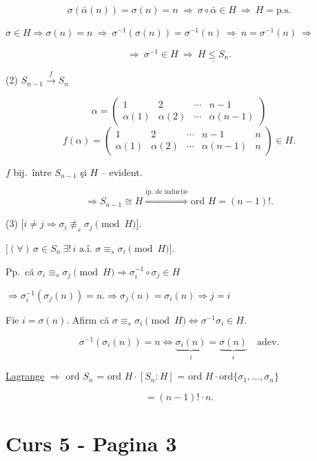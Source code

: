 \[
\sigma(\bar\alpha(n))=\sigma(n)=n \ \Rightarrow \ \sigma\circ\bar\alpha\in H \ \Rightarrow \ H = \text{p.s.}
\]

\noindent $\sigma\in H \Rightarrow \sigma(n)=n \ \Rightarrow \ \sigma^{-1}(\sigma(n))=\sigma^{-1}(n) \ \Rightarrow \ n=\sigma^{-1}(n) \ \Rightarrow$

\[
\Rightarrow \ \sigma^{-1}\in H \ \Rightarrow \ \underline{H\leq S_n}.
\]

\bigskip
\noindent (2) \quad $S_{n-1} \xrightarrow{\ f\ } S_n$

\[
\alpha = \begin{pmatrix} 1 & 2 & \cdots & n-1 \\ \alpha(1) & \alpha(2) & \cdots & \alpha(n-1) \end{pmatrix}
\]
\[
f(\alpha) = \begin{pmatrix} 1 & 2 & \cdots & n-1 & n \\ \alpha(1) & \alpha(2) & \cdots & \alpha(n-1) & n \end{pmatrix} \in H.
\]

\noindent $f$ bij.\ între $S_{n-1}$ şi $H$ -- evident.

\[
\Rightarrow S_{n-1}\cong H \overset{\text{ip.\ de inducție}}{\Longrightarrow} \text{ord } H=(n-1)!.
\]

\bigskip
\noindent (3) \quad $\big[i\neq j \Rightarrow \sigma_i \not\equiv_s \sigma_j \pmod H\big]$.

\noindent $\big[(\forall)\, \sigma\in S_n \ \exists!\, i \text{ a.î. } \sigma\equiv_s \sigma_i \pmod H\big]$.

\bigskip
\noindent Pp.\ că $\sigma_i\equiv_s\sigma_j \pmod H \Rightarrow \sigma_i^{-1}\circ\sigma_j\in H$

\noindent $\Rightarrow \sigma_i^{-1}(\sigma_j(n))=n. \Rightarrow \sigma_j(n)=\sigma_i(n) \Rightarrow j=i$

\bigskip
\noindent Fie $i=\sigma(n)$. Afirm că $\sigma\equiv_s\sigma_i \pmod H \Leftrightarrow \sigma^{-1}\sigma_i\in H$.

\[
\sigma^{-1}(\sigma_i(n))=n \Leftrightarrow \underbrace{\sigma_i(n)}_{i} = \underbrace{\sigma(n)}_{i} \quad \text{adev.}
\]

\bigskip
\noindent\underline{Lagrange} $\Rightarrow$ ord $S_n$ = ord $H\cdot[S_n:H]$ = ord $H\cdot$ord$\{\sigma_1,\ldots,\sigma_n\}$

\[
= (n-1)!\cdot n.
\]



\section*{Curs 5 - Pagina 3}

